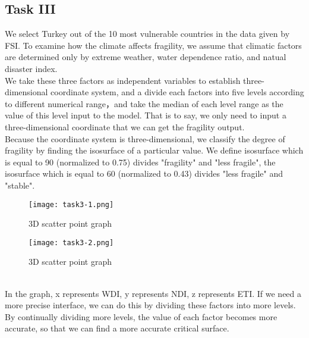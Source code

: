\documentclass{mcmthesis}
\begin{document}
\subsection{Task III}
We select Turkey out of the 10 most vulnerable countries in the data given by FSI. To examine how the climate affects fragility, we assume that climatic factors are determined only by extreme weather, water dependence ratio, and natual disaster index.\\
We take these three factors as independent variables to establish three-dimensional coordinate system, and a divide each factors into five levels according to different numerical range，and take the median of each level range as the value of this level input to the model. That is to say, we only need to input a three-dimensional coordinate that we can get the fragility output.\\
Because the coordinate system is three-dimensional, we classify the degree of fragility by finding the isosurface of a particular value. We define isosurface which is equal to 90 (normalized to 0.75) divides  "fragility" and "less fragile", the isosurface which is equal to 60 (normalized to 0.43) divides "less fragile" and "stable".
\begin{figure}[h]
  \begin{minipage}[h]{0.48\textwidth}
  \flushleft
  \texttt{[image: task3-1.png]}
  \caption{3D scatter point graph}
  \end{minipage}
  \begin{minipage}[h]{0.48\textwidth}
  \flushright
  \texttt{[image: task3-2.png]}
  \caption{3D scatter point graph}
  \end{minipage}
\end{figure} \\
\newpage
In the graph, x represents WDI, y represents NDI, z represents ETI. 
If we need a more precise interface, we can do this by dividing these factors into more levels. By continually dividing more levels, the value of each factor becomes more accurate, so that we can find a more accurate critical surface.
\end{document}
